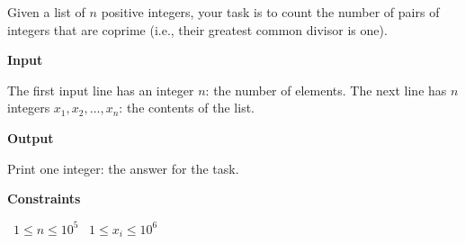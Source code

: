Given a list of $n$ positive integers, your task is to count the number of pairs of integers that are coprime (i.e., their greatest common divisor is one).

\vspace{0.3cm}\noindent\textbf{Input}

The first input line has an integer $n$: the number of elements.
The next line has $n$ integers $x_1,x_2,\dots,x_n$: the contents of the list.

\vspace{0.3cm}\noindent\textbf{Output}

Print one integer: the answer for the task.

\vspace{0.3cm}\noindent\textbf{Constraints}

\textbullet\ $1 \le n \le 10^5$
\textbullet\ $1 \le x_i \le 10^6$